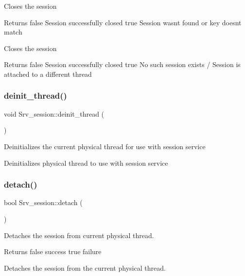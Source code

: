 Closes the session

\begin{DoxyReturn}{Returns}
false Session successfully closed true Session wasn\textquotesingle{}t found or key doesn\textquotesingle{}t match
\end{DoxyReturn}
Closes the session

\begin{DoxyReturn}{Returns}
false Session successfully closed true No such session exists / Session is attached to a different thread 
\end{DoxyReturn}
\mbox{\label{classSrv__session_af092a96167d9b06d812a17ee67db3780}} 
\subsubsection{\texorpdfstring{deinit\+\_\+thread()}{deinit\_thread()}}
{\footnotesize\ttfamily void Srv\+\_\+session\+::deinit\+\_\+thread (\begin{DoxyParamCaption}{ }\end{DoxyParamCaption})\hspace{0.3cm}{\ttfamily [static]}}

Deinitializes the current physical thread for use with session service

Deinitializes physical thread to use with session service \mbox{\label{classSrv__session_a3ab2665c1d523681147c5f502847a126}} 
\subsubsection{\texorpdfstring{detach()}{detach()}}
{\footnotesize\ttfamily bool Srv\+\_\+session\+::detach (\begin{DoxyParamCaption}{ }\end{DoxyParamCaption})}

Detaches the session from current physical thread.

\begin{DoxyReturn}{Returns}
false success true failure
\end{DoxyReturn}
Detaches the session from the current physical thread.

